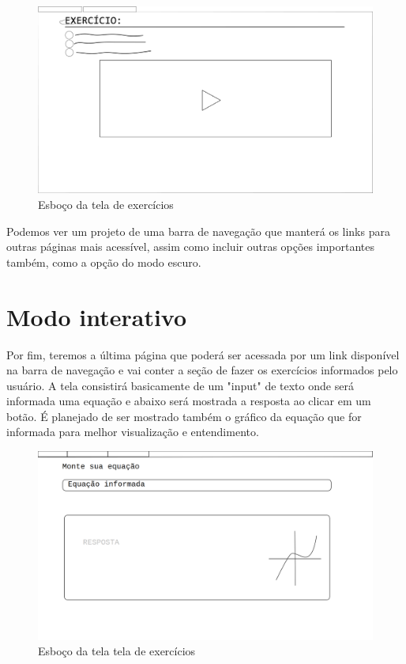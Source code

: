 \documentclass[12pt]{report}
\begin{document}
\begin{figure}[H]
    \includegraphics[width=1\textwidth]{img/A.jpg}
    \caption{Esboço da tela de exercícios}
\end{figure}

Podemos ver um projeto de uma barra de navegação que manterá os links para outras páginas mais acessível, assim como incluir outras opções importantes também, como a opção do modo escuro.

\section{Modo interativo}
Por fim, teremos a última página que poderá ser acessada por um link disponível na barra de navegação e vai conter a seção de fazer os exercícios informados pelo usuário. A tela consistirá basicamente de um "input" de texto onde será informada uma equação e abaixo será mostrada a resposta ao clicar em um botão. É planejado de ser mostrado também o gráfico da equação que for informada para melhor visualização e entendimento.

\begin{figure}[H]
    \includegraphics[width=1\textwidth]{img/d.png}
    \caption{Esboço da tela tela de exercícios}
\end{figure}
\end{document}
